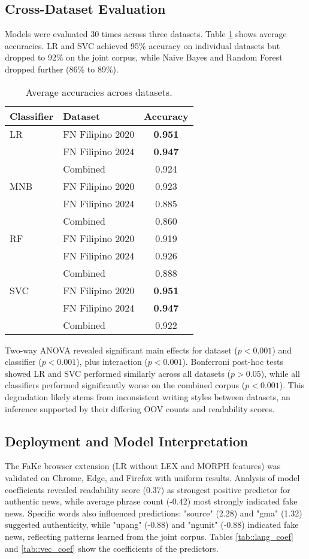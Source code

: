 \documentclass[conference]{IEEEtran}
\begin{document}
\subsection{Cross-Dataset Evaluation}
Models were evaluated 30 times across three datasets. Table \ref{tab::AverageAccuracies} shows average accuracies. LR and SVC achieved 95\% accuracy on individual datasets but dropped to 92\% on the joint corpus, while Naive Bayes and Random Forest dropped further (86\% to 89\%).

\begin{table}[!t]
\centering
\footnotesize
\begin{tabular}{|l|l|c|}
\hline
Classifier & Dataset & Accuracy \\
\hline
LR & FN Filipino 2020 & \textbf{0.951} \\
 & FN Filipino 2024 & \textbf{0.947} \\
 & Combined & 0.924 \\
\hline
MNB & FN Filipino 2020 & 0.923 \\
 & FN Filipino 2024 & 0.885 \\
 & Combined & 0.860 \\
\hline
RF & FN Filipino 2020 & 0.919 \\
 & FN Filipino 2024 & 0.926 \\
 & Combined & 0.888 \\
\hline
SVC & FN Filipino 2020 & \textbf{0.951} \\
 & FN Filipino 2024 & \textbf{0.947} \\
 & Combined & 0.922 \\
\hline
\end{tabular}
\caption{Average accuracies across datasets.}
\label{tab::AverageAccuracies}
\end{table}

Two-way ANOVA revealed significant main effects for dataset ($p<0.001$) and classifier ($p<0.001$), plus interaction ($p<0.001$). Bonferroni post-hoc tests showed LR and SVC performed similarly across all datasets ($p>0.05$), while all classifiers performed significantly worse on the combined corpus ($p<0.001$). This degradation likely stems from inconsistent writing styles between datasets, an inference supported by their differing OOV counts and readability scores.

\subsection{Deployment and Model Interpretation}
The FaKe browser extension (LR without LEX and MORPH features) was validated on Chrome, Edge, and Firefox with uniform results. Analysis of model coefficients revealed readability score (0.37) as strongest positive predictor for authentic news, while average phrase count (-0.42) most strongly indicated fake news. Specific words also influenced predictions: "source" (2.28) and "gma" (1.32) suggested authenticity, while "upang" (-0.88) and "ngunit" (-0.88) indicated fake news, reflecting patterns learned from the joint corpus. Tables \ref{tab::lang_coef} and \ref{tab::vec_coef} show the coefficients of the predictors.
\end{document}

